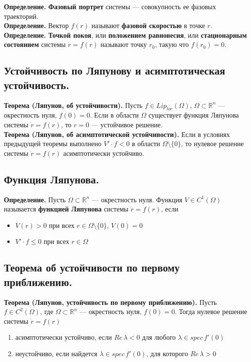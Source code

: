 \documentclass{article}
\begin{document}
\noindent \textbf{Определение.} \textbf{Фазовый портрет} системы --- совокупность ее фазовых траекторий.\\

\noindent \textbf{Определение.} Вектор $f(r)$ называют \textbf{фазовой скоростью} в точке $r$.\\

\noindent \textbf{Определение.} \textbf{Точкой покоя}, или \textbf{положением равновесия}, или \textbf{стационарным состоянием} системы $\dot{r} = f(r)$ называют точку $r_0$, такую что $f(r_0) = 0$.

\subsection{Устойчивость по Ляпунову и асимптотическая устойчивость.}
\textbf{Теорема (Ляпунов, об устойчивости).} Пусть $f \in Lip_{loc}(\Omega)$, $\Omega \subset \mathbb{R}^n$ --- окрестность нуля, $f(0) = 0$. Если в области $\Omega$ существует функция Ляпунова системы $\dot{r} = f(r)$, то $r = 0$ --- устойчивое решение.\\

\noindent \textbf{Теорема (Ляпунов, об асимптотической устойчивости).} Если в условиях предыдущей теоремы выполнено $V' \cdot f < 0$ в области $\Omega \setminus \{0\}$, то нулевое решение системы $\dot{r} = f(r)$ асимптотически устойчиво.

\subsection{Функция Ляпунова.}
\textbf{Определение.} Пусть $\Omega \subset \mathbb{R}^n$ --- окрестность нуля. Функция $V \in C^1(\Omega)$ называется \textbf{функцией Ляпунова} системы $\dot{r} = f(r)$, если
\begin{itemize}
    \item $V(r) > 0$ при всех $r \in \Omega \setminus \{0\}$, $V(0) = 0$
    \item $V' \cdot f \le 0$ при всех $r \in \Omega$
\end{itemize}

\subsection{Теорема об устойчивости по первому приближению.}
\textbf{Теорема (Ляпунов, устойчивость по первому приближению).} Пусть $f \in C^2(\Omega)$, где $\Omega \subset \mathbb{R}^n$ --- окрестность нуля, $f(0) = 0$. Тогда нулевое решение системы $\dot{r} = f(r)$
\begin{enumerate}
    \item асимптотически устойчиво, если $Re\, \lambda < 0$ для любого $\lambda \in spec\, f'(0)$
    \item неустойчиво, если найдется $\lambda \in spec\, f'(0)$, для которого $Re\, \lambda > 0$
\end{enumerate}
\end{document}
